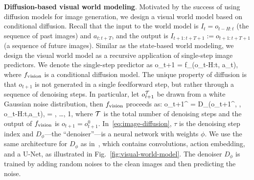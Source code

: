 \textbf{Diffusion-based visual world modeling}. Motivated by the success of using diffusion models for image generation, we design a visual world model based on conditional diffusion. Recall that the input to the world model is $I_t = o_{t-H:t}$ (the sequence of past images) and $a_{t:t+T}$, and the output is $I_{t+1:t+T+1}:= o_{t+1:t+T+1}$ (a sequence of future images). Similar as the state-based world modeling, we design the visual world model as a recursive application of single-step image predictors. We denote the single-step predictor as
\bea \label{eq:single-step-predictor}
o_{t+1} = f_\vision(o_{t-H:t}, a_t),
\eea 
where $f_{\text{vision}}$ is a conditional diffusion model. The unique property of diffusion is that $o_{t+1}$ is not generated in a single feedforward step, but rather through a sequence of denoising steps. In particular, let $o_{t+1}^{{\cal T}}$ be drawn from a white Gaussian noise distribution, then $f_{\text{vision}}$ proceeds as:
\bea \label{eq:image-diffusion}
o_{t+1}^{} = D_{\phi}(o_{t+1}^\tau, \tau, o_{t-H:t},a_t), \tau = \calT, \dots, 1,
\eea
where ${\cal T}$ is the total number of denoising steps and the output of $f_{\text{vision}}$ is $o_{t+1} = o_{t+1}^0$. In~\eqref{eq:image-diffusion}, $\tau$ is the denoising step index and $D_{\phi}$---the ``denoiser''---is a neural network with weights $\phi$. We use the same architecture for $D_\phi$ as in~\cite{alonso2024diffusionworldmodelingvisual}, which contains convolutions, action embedding, and a U-Net, as illustrated in Fig.~\ref{fig:visual-world-model}. The denoiser $D_\phi$ is trained by adding random noises to the clean images and then predicting the noise.



